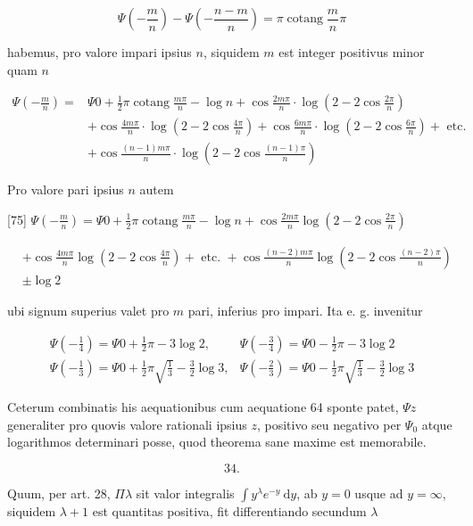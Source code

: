 \documentclass[10pt]{article}
\begin{document}
\[
\Psi\left(-\frac{m}{n}\right)-\Psi\left(-\frac{n-m}{n}\right)=\pi \operatorname{cotang} \frac{m}{n} \pi
\]

habemus, pro valore impari ipsius \(n\), siquidem \(m\) est integer positivus minor quam \(n\)

\[
\begin{aligned}
\Psi\left(-\frac{m}{n}\right)= & \Psi 0+\frac{1}{2} \pi \operatorname{cotang} \frac{m \pi}{n}-\log n+\cos \frac{2 m \pi}{n} \cdot \log \left(2-2 \cos \frac{2 \pi}{n}\right) \\
& +\cos \frac{4 m \pi}{n} \cdot \log \left(2-2 \cos \frac{4 \pi}{n}\right)+\cos \frac{6 m \pi}{n} \cdot \log \left(2-2 \cos \frac{6 \pi}{n}\right)+\text { etc. } \\
& +\cos \frac{(n-1) m \pi}{n} \cdot \log \left(2-2 \cos \frac{(n-1) \pi}{n}\right)
\end{aligned}
\]

Pro valore pari ipsius \(n\) autem

[75] \(\Psi\left(-\frac{m}{n}\right)=\Psi 0+\frac{1}{2} \pi \operatorname{cotang} \frac{m \pi}{n}-\log n+\cos \frac{2 m \pi}{n} \log \left(2-2 \cos \frac{2 \pi}{n}\right)\)

\[
\begin{aligned}
& +\cos \frac{4 m \pi}{n} \log \left(2-2 \cos \frac{4 \pi}{n}\right)+\text { etc. }+\cos \frac{(n-2) m \pi}{n} \log \left(2-2 \cos \frac{(n-2) \pi}{n}\right) \\
& \pm \log 2
\end{aligned}
\]

ubi signum superius valet pro \(m\) pari, inferius pro impari. Ita e. g. invenitur

\[
\begin{array}{ll}
\Psi\left(-\frac{1}{4}\right)=\Psi 0+\frac{1}{2} \pi-3 \log 2, & \Psi\left(-\frac{3}{4}\right)=\Psi 0-\frac{1}{2} \pi-3 \log 2 \\
\Psi\left(-\frac{1}{3}\right)=\Psi 0+\frac{1}{2} \pi \sqrt{\frac{1}{3}}-\frac{3}{2} \log 3, & \Psi\left(-\frac{2}{3}\right)=\Psi 0-\frac{1}{2} \pi \sqrt{\frac{1}{3}}-\frac{3}{2} \log 3
\end{array}
\]

Ceterum combinatis his aequationibus cum aequatione 64 sponte patet, \(\Psi z\) generaliter pro quovis valore rationali ipsius \(z\), positivo seu negativo per \(\Psi_{0}\) atque logarithmos determinari posse, quod theorema sane maxime est memorabile.

\[
34 .
\]

Quum, per art. 28, \(\Pi \lambda\) sit valor integralis \(\int y^{\lambda} e^{-y} \mathrm{~d} y\), ab \(y=0\) usque ad \(y=\infty\), siquidem \(\lambda+1\) est quantitas positiva, fit differentiando secundum \(\lambda\)
\end{document}
